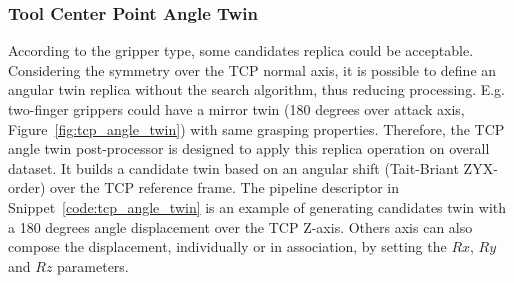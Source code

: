 \subsubsection{Tool Center Point Angle Twin}
\label{cap4:modular_grasping_architecture:sec:grasping_synthesis:subsec:postprocessor:subsubsec:tcp_angle_twin}

According to the gripper type, some candidates replica could be acceptable. Considering the symmetry over the TCP normal axis, it is possible to define an angular twin replica without the search algorithm, thus reducing processing. E.g. two-finger grippers could have a mirror twin (180 degrees over attack axis, Figure~\ref{fig:tcp_angle_twin}) with same grasping properties. Therefore, the TCP angle twin post-processor is designed to apply this replica operation on overall dataset. It builds a candidate twin based on an angular shift (Tait-Briant ZYX-order) over the TCP reference frame.  The pipeline descriptor in Snippet~\ref{code:tcp_angle_twin} is an example of generating candidates twin with a 180 degrees angle displacement over the TCP Z-axis. Others axis can also compose the displacement, individually or in association, by setting the $Rx$, $Ry$ and $Rz$ parameters.

\begin{figure}[h!]
\end{figure}

